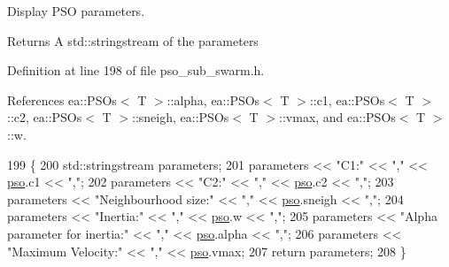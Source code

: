 Display P\+SO parameters. 

\begin{DoxyReturn}{Returns}
A std\+::stringstream of the parameters 
\end{DoxyReturn}


Definition at line 198 of file pso\+\_\+sub\+\_\+swarm.\+h.



References ea\+::\+P\+S\+Os$<$ T $>$\+::alpha, ea\+::\+P\+S\+Os$<$ T $>$\+::c1, ea\+::\+P\+S\+Os$<$ T $>$\+::c2, ea\+::\+P\+S\+Os$<$ T $>$\+::sneigh, ea\+::\+P\+S\+Os$<$ T $>$\+::vmax, and ea\+::\+P\+S\+Os$<$ T $>$\+::w.


\begin{DoxyCode}
199         \{
200             std::stringstream parameters;
201             parameters << \textcolor{stringliteral}{"C1:"} << \textcolor{stringliteral}{","} << \hyperlink{classea_1_1_solver_3_01_p_s_os_00_01_t_00_01_f_00_01_c_01_4_a1f1aa62756a73565ebe0ca1fbc084ea5}{pso}.c1 << \textcolor{stringliteral}{","};
202             parameters << \textcolor{stringliteral}{"C2:"} << \textcolor{stringliteral}{","} << \hyperlink{classea_1_1_solver_3_01_p_s_os_00_01_t_00_01_f_00_01_c_01_4_a1f1aa62756a73565ebe0ca1fbc084ea5}{pso}.c2 << \textcolor{stringliteral}{","};
203             parameters << \textcolor{stringliteral}{"Neighbourhood size:"} << \textcolor{stringliteral}{","} << \hyperlink{classea_1_1_solver_3_01_p_s_os_00_01_t_00_01_f_00_01_c_01_4_a1f1aa62756a73565ebe0ca1fbc084ea5}{pso}.sneigh << \textcolor{stringliteral}{","};
204             parameters << \textcolor{stringliteral}{"Inertia:"} << \textcolor{stringliteral}{","} << \hyperlink{classea_1_1_solver_3_01_p_s_os_00_01_t_00_01_f_00_01_c_01_4_a1f1aa62756a73565ebe0ca1fbc084ea5}{pso}.w << \textcolor{stringliteral}{","};
205             parameters << \textcolor{stringliteral}{"Alpha parameter for inertia:"} << \textcolor{stringliteral}{","} << \hyperlink{classea_1_1_solver_3_01_p_s_os_00_01_t_00_01_f_00_01_c_01_4_a1f1aa62756a73565ebe0ca1fbc084ea5}{pso}.alpha << \textcolor{stringliteral}{","};
206             parameters << \textcolor{stringliteral}{"Maximum Velocity:"} << \textcolor{stringliteral}{","} << \hyperlink{classea_1_1_solver_3_01_p_s_os_00_01_t_00_01_f_00_01_c_01_4_a1f1aa62756a73565ebe0ca1fbc084ea5}{pso}.vmax;
207             \textcolor{keywordflow}{return} parameters;
208         \}
\end{DoxyCode}
\mbox{\label{classea_1_1_solver_3_01_p_s_os_00_01_t_00_01_f_00_01_c_01_4_abb67d82749ba9525e7c8c68f5494389f}} 
